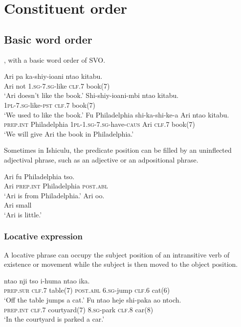 \chapter{Constituent order}

\section{Basic word order}
, with a basic word order of SVO.

\begin{exe}
\ex
\gll Ari pa ka-shiy-ioani nta\textbeltl o kitabu. \\
Ari not \textsc{1.sg}-\textsc{7.sg}-like \textsc{clf}.7 book(7) \\
\trans `Ari doesn't like the book.'
\ex
\gll Shi-shiy-ioani-mbi nta\textbeltl o kitabu. \\
\textsc{1pl}-\textsc{7.sg}-like-\textsc{pst} \textsc{clf}.7 book(7) \\
\trans `We used to like the book.'\ex
\gll Fu Philadelphia shi-ka-shi-ke-\textbeltl a Ari nta\textbeltl o kitabu. \\
\textsc{prep.int} Philadelphia \textsc{1pl}-\textsc{1.sg}-\textsc{7.sg}-have-\textsc{caus} Ari \textsc{clf}.7 book(7) \\
\trans `We will give Ari the book in Philadelphia.'
\end{exe}

Sometimes in Ishiculu, the predicate position can be filled by an uninflected adjectival phrase, such as an adjective or an adpositional phrase.

\begin{exe}
\ex
\gll Ari fu Philadelphia tso. \\
Ari \textsc{prep.int} Philadelphia \textsc{post.abl} \\
\trans `Ari is from Philadelphia.'
\ex
\gll Ari \textbeltl o\textbeltl o. \\
Ari small \\
\trans `Ari is little.'
\end{exe}

\subsection{Locative expression}
A locative phrase can occupy the subject position of an intransitive verb of existence or movement while the subject is then moved to the object position.

\begin{exe}
\ex
{} nta\textbeltl o nji tso \textbeltl i-huma nta\textbeltl o ika. \\
\textsc{prep.sur} \textsc{clf.7} table(7) \textsc{post.abl} \textsc{6.sg}-jump \textsc{clf}.6 cat(6) \\
\trans `Off the table jumps a cat.'
\ex
\gll Fu nta\textbeltl o heje shi-paka a\textlyoghlig o ntoch\textramshorns. \\
\textsc{prep.int} \textsc{clf.7} courtyard(7) \textsc{8.sg}-park \textsc{clf}.8 car(8) \\
\trans `In the courtyard is parked a car.'
\end{exe}

